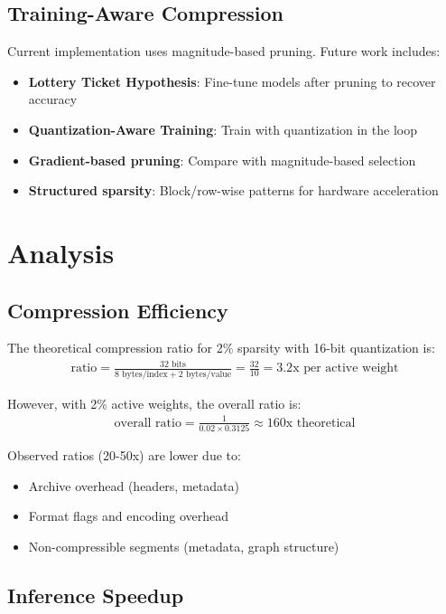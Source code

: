 \documentclass[11pt]{article}
\begin{document}
\subsection{Training-Aware Compression}

Current implementation uses magnitude-based pruning. Future work includes:

\begin{itemize}
    \item \textbf{Lottery Ticket Hypothesis}: Fine-tune models after pruning to recover accuracy
    \item \textbf{Quantization-Aware Training}: Train with quantization in the loop
    \item \textbf{Gradient-based pruning}: Compare with magnitude-based selection
    \item \textbf{Structured sparsity}: Block/row-wise patterns for hardware acceleration
\end{itemize}

\section{Analysis}

\subsection{Compression Efficiency}

The theoretical compression ratio for 2\% sparsity with 16-bit quantization is:
\begin{align}
\text{ratio} = \frac{32 \text{ bits}}{8 \text{ bytes/index} + 2 \text{ bytes/value}} = \frac{32}{10} = 3.2\text{x per active weight}
\end{align}

However, with 2\% active weights, the overall ratio is:
\begin{align}
\text{overall ratio} = \frac{1}{0.02 \times 0.3125} \approx 160\text{x theoretical}
\end{align}

Observed ratios (20-50x) are lower due to:
\begin{itemize}
    \item Archive overhead (headers, metadata)
    \item Format flags and encoding overhead
    \item Non-compressible segments (metadata, graph structure)
\end{itemize}

\subsection{Inference Speedup}
\end{document}
